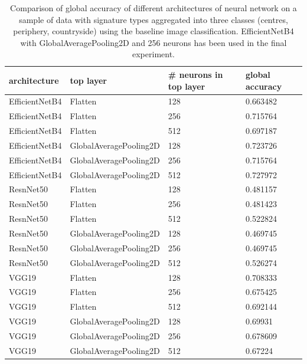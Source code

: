\documentclass[]{interact}
\theoremstyle{plain}%
\theoremstyle{definition}
\theoremstyle{remark}
\begin{document}
\begin{table}
    \centering
\begin{tabular}{llll}
    \toprule
    architecture & top layer & \# neurons in top layer &       global accuracy \\
    \midrule
    EfficientNetB4 &   Flatten &                    128 &  0.663482 \\
    EfficientNetB4 &   Flatten &                    256 &  0.715764 \\
    EfficientNetB4 &   Flatten &                    512 &  0.697187 \\
    EfficientNetB4 &   GlobalAveragePooling2D &                    128 &  0.723726 \\
    EfficientNetB4 &   GlobalAveragePooling2D &                    256 &  0.715764 \\
    EfficientNetB4 &   GlobalAveragePooling2D &                    512 &  0.727972 \\
        ResnNet50 &   Flatten &                    128 &  0.481157 \\
        ResnNet50 &   Flatten &                    256 &  0.481423 \\
        ResnNet50 &   Flatten &                    512 &  0.522824 \\
        ResnNet50 &   GlobalAveragePooling2D &                    128 &  0.469745 \\
        ResnNet50 &   GlobalAveragePooling2D &                    256 &  0.469745 \\
        ResnNet50 &   GlobalAveragePooling2D &                    512 &  0.526274 \\
           VGG19 &   Flatten &                    128 &  0.708333 \\
           VGG19 &   Flatten &                    256 &  0.675425 \\
           VGG19 &   Flatten &                    512 &  0.692144 \\
           VGG19 &   GlobalAveragePooling2D &                    128 &   0.69931 \\
           VGG19 &   GlobalAveragePooling2D &                    256 &  0.678609 \\
           VGG19 &   GlobalAveragePooling2D &                    512 &   0.67224 \\
    \bottomrule
    \end{tabular}
\caption{\label{tab:app_nns}Comparison of global accuracy of different
architectures of neural network on a sample of data with signature types aggregated into
three classes (centres, periphery, countryside) using the baseline image classification.
EfficientNetB4 with GlobalAveragePooling2D and 256 neurons has been used in the final
experiment.}
\end{table}
\end{document}
